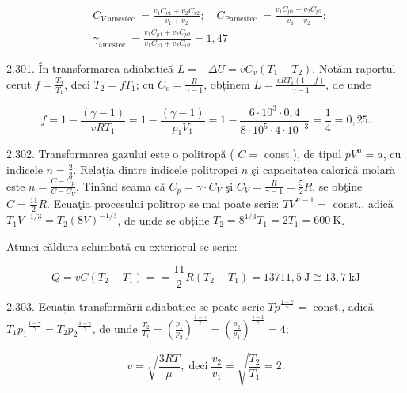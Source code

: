 \documentclass[10pt]{article}
\begin{document}
$$
\begin{aligned}
& C_{V \text { amestec }}=\frac{v_{1} C_{v 1}+v_{2} C_{v 2}}{v_{1}+v_{2}} ; \quad C_{\text {Pamestec }}=\frac{v_{1} C_{p 1}+v_{2} C_{p 2}}{v_{1}+v_{2}} ; \\
& \gamma_{\text {amestec }}=\frac{v_{1} C_{p 1}+v_{2} C_{p 2}}{v_{1} C_{v 1}+v_{2} C_{v 2}}=1,47
\end{aligned}
$$

2.301. În transformarea adiabatică $L=-\Delta U=v C_{v}\left(T_{1}-T_{2}\right)$. Notăm raportul cerut $f=\frac{T_{2}}{T_{1}}$, deci $T_{2}=f T_{1}$; cu $C_{v}=\frac{R}{\gamma-1}$, obținem $L=\frac{v R T_{1}(1-f)}{\gamma-1}$, de unde

$$
f=1-\frac{(\gamma-1)}{v R T_{1}}=1-\frac{(\gamma-1)}{p_{1} V_{1}}=1-\frac{6 \cdot 10^{3} \cdot 0,4}{8 \cdot 10^{5} \cdot 4 \cdot 10^{-3}}=\frac{1}{4}=0,25 .
$$

2.302. Transformarea gazului este o politropă ( $C=$ const.), de tipul $p V^{n}=a$, cu indicele $n=\frac{2}{3}$. Relația dintre indicele politropei $n$ şi capacitatea calorică molară este $n=\frac{C-C_{p}}{C-C_{V}}$. Tinând seama că $C_{p}=\gamma \cdot C_{V}$ şi $C_{V}=\frac{R}{\gamma-1}=\frac{5}{2} R$, se obţine $C=\frac{11}{2} R$. Ecuaţia procesului politrop se mai poate scrie: $T V^{n-1}=$ const., adică $T_{1} V^{-1 / 3}=T_{2}(8 V)^{-1 / 3}$, de unde se obține $T_{2}=8^{1 / 3} T_{1}=2 T_{1}=600 \mathrm{~K}$.

Atunci căldura schimbată cu exteriorul se scrie:

$$
Q=v C\left(T_{2}-T_{1}\right)==\frac{11}{2} R\left(T_{2}-T_{1}\right)=13711,5 \mathrm{~J} \cong 13,7 \mathrm{~kJ}
$$

2.303. Ecuația transformării adiabatice se poate scrie $T p^{\frac{1-\gamma}{\gamma}}=$ const., adică $T_{1} p_{1}{ }^{\frac{1-\gamma}{\gamma}}=T_{2} p_{2}{ }^{\frac{1-\gamma}{\gamma}}$, de unde $\frac{T_{2}}{T_{1}}=\left(\frac{p_{1}}{p_{2}}\right)^{\frac{1-\gamma}{\gamma}}=\left(\frac{p_{2}}{p_{1}}\right)^{\frac{\gamma-1}{\gamma}}=4$;

$$
v=\sqrt{\frac{3 R T}{\mu}}, \operatorname{deci} \frac{v_{2}}{v_{1}}=\sqrt{\frac{T_{2}}{T_{1}}}=2 .
$$
\end{document}
